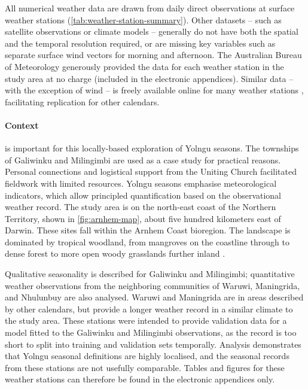 All numerical weather data are drawn from daily direct observations at
surface weather stations (\cref{tab:weather-station-summary}).
Other datasets -- such as satellite observations or
climate models -- generally do not have both the spatial and the
temporal resolution required, or are missing key variables such as separate
surface wind vectors for morning and afternoon.
%
%
The Australian Bureau of Meteorology generously provided the data for each
weather station in the study area at no charge (included in the electronic appendices).
Similar data -- with the exception of wind -- is freely available online
for many weather stations , facilitating replication for other
calendars.


\paragraph{Context}
is important for this locally-based exploration of Yolngu seasons.
The townships of Galiwinku and Milingimbi are used as a case study for
practical reasons.  Personal connections and
logistical support from the Uniting Church facilitated fieldwork with limited
resources.  Yolngu seasons emphasise meteorological indicators, which allow
principled quantification based on the observational weather record.
%
The study area is on the north-east coast of the Northern Territory, shown
in  \cref{fig:arnhem-map}, about five hundred kilometers east of Darwin.
These sites fall within the Arnhem Coast bioregion.  The landscape is
dominated by tropical woodland, from mangroves on the coastline through
to dense forest to more open woody grasslands further inland \citep{ens2014}.


Qualitative seasonality is described for Galiwinku and Milingimbi;
quantitative weather observations from the neighboring communities of Waruwi, Maningrida, and Nhulunbuy
are also analysed.  Waruwi and Maningrida are in areas described by
other calendars, but provide a longer weather record in a similar climate
to the study area.
%
These stations were intended to provide validation data for a model fitted
to the Galiwinku and Milingimbi observations, as the record is too short to
split into training and validation sets temporally.  Analysis demonstrates
that Yolngu seasonal definitions are highly localised, and the seasonal
records from these stations are not usefully comparable.  Tables and figures
for these weather stations can therefore be found in the electronic appendices only.


